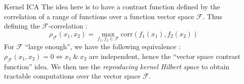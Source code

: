 \documentclass{beamer}
\begin{document}
\begin{frame}{}
\begin{columns}[T]
\begin{column}{.48\linewidth}



\begin{block}{Kernel ICA}
	The idea here is to have a contrast function defined by the correlation of a range of functions over a function vector space $\mathcal{F}$. Thus defining the $\mathcal{F}$-correlation :
	\begin{equation*}
		\rho_{\mathcal{F}} (x_1,x_2) = \max\limits_{f_1,f_2 \in \mathcal{F}} \text{corr}(f_1(x_1),f_2(x_2))
	\end{equation*}
For $\mathcal{F}$ ``large enough'', we have the following equivalence : $\rho_{\mathcal{F}} (x_1,x_2) = 0 \Longleftrightarrow x_1 \ \& \ x_2$ are independent, hence the ``vector space contrast function'' idea.
	We then use the \textit{reproducing kernel Hilbert space} to obtain tractable computations over the vector space $\mathcal{F}$.
\end{block}


\end{column}

\begin{column}{.48\linewidth}


\end{column}
\end{columns}
\end{frame}
\end{document}
